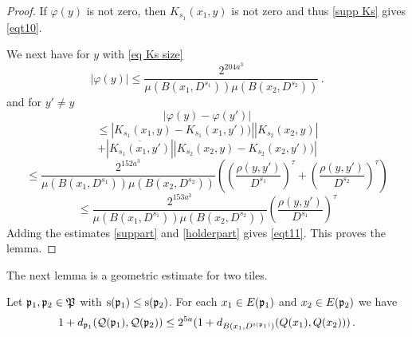 \begin{proof}

If $\varphi(y)$ is not zero, then $K_{s_1}(x_1, y)$ is not zero and thus
\eqref{supp Ks} gives \eqref{eqt10}.

We next have for $y$ with \eqref{eq Ks size}
\begin{equation}\label{suppart}
    |\varphi(y)|\le
    \frac{2^{204 a^3}}{\mu(B(x_1, D^{s_1}))\mu(B(x_2, D^{s_2}))}\, .
\end{equation}
and for $y'\neq y$
\begin{equation}
    |\varphi(y)-\varphi(y')|
 \end{equation}
 \begin{equation}
 \le
 |K_{s_1}(x_1,y)-K_{s_1}(x_1,y'))||
 K_{s_2}(x_2, y)|
\end{equation}
 \begin{equation}+| \overline{K_{s_1}(x_1, y')}|
 |K_{s_2}(x_2, y) - K_{s_2}(x_2, y'))|
\end{equation}
\begin{equation}
      \le \frac{2^{152 a^3}}{\mu(B(x_1, D^{s_1}))\mu(B(x_2, D^{s_2}))}
       \left(\left(\frac{ \rho(y,y')}{D^{s_1}}\right)^{\tau}+
       \left(\frac{ \rho(y,y')}{D^{s_2}}\right)^{\tau}\right)
\end{equation}
\begin{equation}\label{holderpart}
      \le \frac{2^{153 a^3}}{\mu(B(x_1, D^{s_1}))\mu(B(x_2, D^{s_2}))}
       \left(\frac{ \rho(y,y')}{D^{s_1}}\right)^{\tau}
\end{equation}
Adding the estimates \eqref{suppart} and \eqref{holderpart} gives \eqref{eqt11}.
This proves the lemma.
\end{proof}
The next lemma is a geometric estimate for two tiles.
\begin{lemma}\label{lem tgeo}
    Let $\mathfrak p_1, \mathfrak p_2\in \mathfrak P$ with
$\mathrm{s}({\mathfrak p_1})\leq \mathrm{s}({\mathfrak p_2})$. For each $x_1\in E(\mathfrak p_1)$ and
$x_2\in E(\mathfrak p_2)$  we have
\begin{equation}\label{tgeo}
  1+d_{\mathfrak p_1}(\mathcal{Q}(\mathfrak p_1), \mathcal{Q}(\mathfrak p_2))\le
    2^{5a}(1 + d_{B(x_1, D^{\mathrm{s}(\mathfrak p_1)})}({Q}(x_1),{Q}(x_2)))\, .
\end{equation}
\end{lemma}
